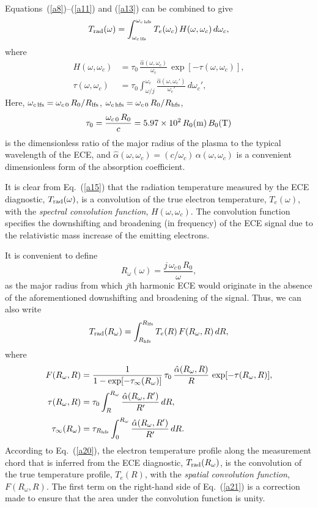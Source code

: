 \documentclass[12pt,prb,aps]{revtex4-1}
\begin{document}
Equations~(\ref{a8})--(\ref{a11}) and (\ref{a13}) can be combined to give
\begin{equation}\label{a15}
T_{\rm rad}(\omega) = \int_{\omega_{c\,{\rm lfs}}}^{\omega_{c\,{\rm hfs}}}T_e(\omega_c)\,H(\omega,\omega_c)\,d\omega_c,
\end{equation}
where
\begin{align}
H(\omega,\omega_c)&=\tau_0\,\frac{\hat{\alpha}(\omega,\omega_c)}{\omega_c}\,\exp\left[-\tau(\omega,\omega_c)\right],\\[0.5ex]
\tau(\omega,\omega_c)&= \tau_0\int_{\omega/j}^{\omega_c}\frac{\hat{\alpha}(\omega,\omega_c')}{\omega_c'}\,d\omega_c',
\end{align}
Here, $\omega_{c\,{\rm lfs}}= \omega_{c\,0}\,R_0/R_{\rm lfs}$,  $\omega_{c\,{\rm hfs}}= \omega_{c\,0}\,R_0/R_{\rm hfs}$, 
\begin{equation}
\tau_0 = \frac{\omega_{c\,0}\,R_0}{c}= 5.97\times 10^2\,R_0({\rm m})\,B_0({\rm T})
\end{equation}
is the dimensionless  ratio of the major radius of the plasma to the typical wavelength of the ECE, and $\hat{\alpha}(\omega,\omega_c) = (c/\omega_c)\,\alpha(\omega,\omega_c)$
is a convenient dimensionless form of the absorption coefficient. 

 It is clear from Eq.~(\ref{a15}) that the radiation temperature measured by the ECE diagnostic, $T_{\rm rad}(\omega)$,  is a convolution of the true
electron temperature, $T_e(\omega)$,  with the {\em spectral convolution function}, $H(\omega,\omega_c)$. The convolution function specifies the downshifting and broadening   (in frequency) of the ECE
signal due to the relativistic mass increase of the emitting electrons.

It is convenient to define
\begin{equation}
R_\omega(\omega) = \frac{j\,\omega_{c\,0}\,R_0}{\omega},
\end{equation}
as the major radius from which $j$th harmonic ECE would originate in the absence of the aforementioned downshifting and broadening of the signal. 
Thus, we can also write
\begin{equation}\label{a20}
T_{\rm rad}(R_\omega) = \int^{R_{\rm lfs}}_{R_{\rm hfs}}T_e(R)\,F(R_\omega,R)\,dR,
\end{equation}
where
\begin{align}\label{a21}
F(R_\omega,R) &= \frac{1}{1-\exp[-\tau_\infty(R_\omega)]}\,\tau_0\,\frac{\hat{\alpha}(R_\omega,R)}{R}\,\exp[-\tau(R_\omega, R)],\\[0.5ex]
\tau(R_\omega,R) &= \tau_0\int_R^{R_\omega}\frac{\hat{\alpha}(R_\omega,R')}{R'}\,dR,\\[0.5ex]
\tau_\infty(R_\omega) &= \tau_{R_{\rm hfs}}\int_0^{R_\omega}\frac{\hat{\alpha}(R_\omega,R')}{R'}\,dR.\label{tinf}
\end{align}
According to Eq.~(\ref{a20}), the electron temperature profile along the measurement chord that is inferred from the ECE diagnostic, $T_{\rm rad}(R_\omega)$,
is the convolution of the true temperature profile, $T_e(R)$, with the {\em spatial convolution function}, $F(R_\omega,R)$. The first term on the right-hand side of
Eq.~(\ref{a21}) is a correction made to ensure that the area under the convolution function is unity. 
\end{document}
